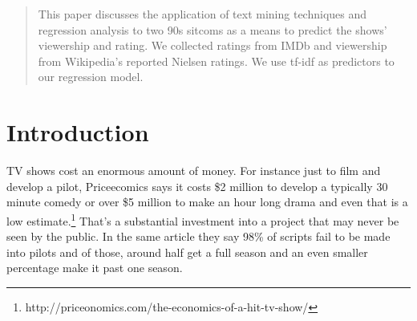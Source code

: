 \documentclass{sig-alternate-05-2015}
\begin{document}
%
\author{
%
%
\alignauthor
Katherine Schinkel\\
       \\
       \\
\alignauthor
Marcus Rosti\\
       \\
       \\
}
\date{6 May 2014}

\maketitle
\begin{abstract}
This paper discusses the application of text mining techniques and regression analysis to two 90s sitcoms as a means to predict the shows' viewership and rating. We collected ratings from IMDb and viewership from Wikipedia's reported Nielsen ratings. We use tf-idf as predictors to our regression model.
\end{abstract}

%
%


\section{Introduction}
TV shows cost an enormous amount of money. For instance just to film and develop a pilot, Priceecomics says it costs \$2 million to develop a typically 30 minute comedy or over \$5 million to make an hour long drama and even that is a low estimate.\footnote{http://priceonomics.com/the-economics-of-a-hit-tv-show/} That's a substantial investment into a project that may never be seen by the public. In the same article they say 98\% of scripts fail to be made into pilots and of those, around half get a full season and an even smaller percentage make it past one season. 
\end{document}
